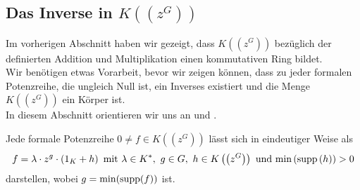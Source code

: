 \subsection{Das Inverse in $K\left(\left(z^{G}\right)\right)$ }
%
%
%
%
%
Im vorherigen Abschnitt haben wir gezeigt, dass $K\left(\left(z^{G}\right)\right)$ bezüglich der definierten Addition und Multiplikation einen kommutativen Ring bildet. \\
Wir benötigen etwas Vorarbeit, bevor wir zeigen können, dass zu jeder formalen Potenzreihe, die ungleich Null ist, ein Inverses existiert und die Menge  $K\left(\left(z^{G}\right)\right)$ ein Körper ist.\\
In diesem Abschnitt orientieren wir uns an \cite[S. 196- 198]{fuchs66} und \cite[S. 210- 213]{neumann49}.
% 
%
%
%
%
%
\begin{satz}\label{JedePotenzreihesoDarstellbar}
Jede formale Potenzreihe $0 \neq f \in K\left(\left(z^{G}\right)\right)$ lässt sich in eindeutiger Weise als  \\
\[f = \lambda\cdot z^g\cdot \left(1_K + h\right)\text{ mit } \lambda \in K^*, ~g \in G,~h \in K\left(\left(z^{G}\right)\right) \text{ und } \textup{min}\left(\textup{supp}\left(h\right)\right) > 0 \] darstellen, wobei $g= \min(\textup{supp}(f))$ ist.
\end{satz}
%
%
